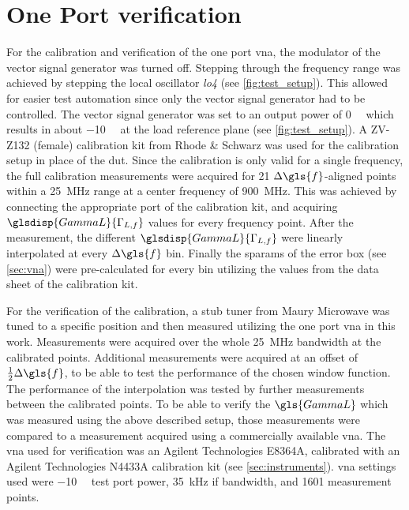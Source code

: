 \documentclass[12pt,a4paper,parskip=full,abstract=true,BCOR=12mm,twoside,open=right]{scrreprt}
\def\device#1{\textit{#1}}
\begin{document}

\section{One Port  verification}
\label{sec:vna_verify}

For the calibration and verification of the one port \gls{vna}, the modulator of
the vector signal generator was turned off. Stepping through the frequency range
was achieved by stepping the local oscillator \device{lo4} (see \cref{fig:test_setup}).
This allowed for easier test automation since only the vector signal generator had to
be controlled. The vector signal generator was set to an output power of \SI{0}{\deci\belm}
which results in about \SI{-10}{\deci\belm} at the load reference plane (see \cref{fig:test_setup}). A ZV-Z132 (female) calibration kit from Rhode \& Schwarz was used for the calibration
setup in place of the \gls{dut}. Since the calibration is only valid for a single frequency, the full
calibration measurements were acquired for 21 $\Delta{}\gls{f}$-aligned points within a
\SI{25}{\mega\hertz} range at a center frequency of \SI{900}{\mega\hertz}. This
was achieved by connecting the appropriate port of the calibration kit, and acquiring
$\glsdisp{GammaL}{\Gamma_{L,f}}$ values for every frequency point. After the measurement, the different $\glsdisp{GammaL}{\Gamma_{L,f}}$ were linearly
interpolated at every $\Delta{}\gls{f}$ bin. Finally the \glspl{sparam} of
the error box (see \cref{sec:vna}) were pre-calculated for every bin utilizing the values
from the data sheet of the calibration kit\cite{zv-z132}.

For the verification of the calibration, a stub tuner from Maury Microwave was tuned to a specific position and
then measured utilizing the one port \gls{vna} in this work. Measurements were acquired over
the whole \SI{25}{\mega\hertz} bandwidth at the calibrated points. Additional measurements
were acquired at an offset of $\frac{1}{2}\Delta{}\gls{f}$, to be able to test the performance
of the chosen window function. The performance of the interpolation was tested by further
measurements between the calibrated points. To be able to verify the $\gls{GammaL}$ which was measured using the
above described setup, those measurements were compared to a measurement acquired using a
commercially available \gls{vna}. The \gls{vna} used for verification was an Agilent Technologies E8364A,
calibrated with an Agilent Technologies N4433A calibration kit (see \cref{sec:instruments}). \gls{vna}
settings used were \SI{-10}{\deci\belm} test port power, \SI{35}{\kilo\hertz} \gls{if} bandwidth, and
1601 measurement points.
\end{document}
